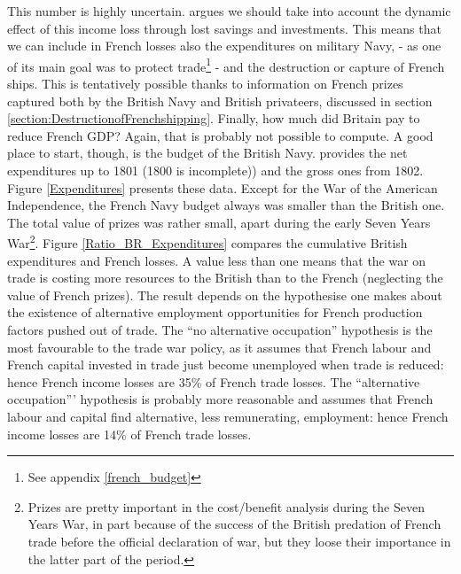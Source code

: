 \documentclass[12pt,a4paper,notitlepage,english]{article}
\begin{document}
This number is highly uncertain. \cite{Daudin2005} argues we should take into account the dynamic effect of this income loss through lost savings and investments. 
This means that we can include in French losses also the expenditures on military Navy, - as one of its main goal was to protect trade\footnote{See appendix \ref{french_budget}} - and the destruction or capture of French ships. This is tentatively possible thanks to information on French prizes captured both by the British Navy and British privateers, discussed in section \ref{section:DestructionofFrenchshipping}.
Finally, how much did Britain pay to reduce French GDP? Again, that is probably not possible to compute. A good place to start, though, is the budget of the British Navy. \cite[pp. 570-587]{mitchell1988} provides the net expenditures up to 1801 (1800 is incomplete)) and the gross ones from 1802.
Figure \ref{Expenditures} presents these data. Except for the War of the American Independence, the French Navy budget always was smaller than the British one. The total value of prizes was rather small, apart during the early Seven Years War\footnote{Prizes are pretty important in the cost/benefit analysis during the Seven Years War, in part because of the success of the British predation of French trade before the official declaration of war, but they loose their importance in the latter part of the period.}.
Figure \ref{Ratio_BR_Expenditures} compares the cumulative British expenditures and French losses. A value less than one means that the war on trade is costing more resources to the British than to the French (neglecting the value of French prizes). 
The result depends on the hypothesise one makes about the existence of alternative employment opportunities for French production factors pushed out of trade. The ``no alternative occupation'' hypothesis is the most favourable to the trade war policy, as it assumes that French labour and French capital invested in trade just become unemployed when trade is reduced: hence French income losses are 35\% of French trade losses. The ``alternative occupation''' hypothesis is probably more reasonable and assumes that French labour and capital find alternative, less remunerating, employment: hence French income losses are 14\% of French trade losses.
\end{document}
